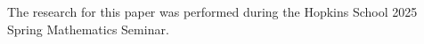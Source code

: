 \documentclass[10pt]{article}
\theoremstyle{definition}
\begin{document}
\vskip 20pt

The research for this paper was performed during the Hopkins School 2025 Spring Mathematics Seminar. 

\end{document}
